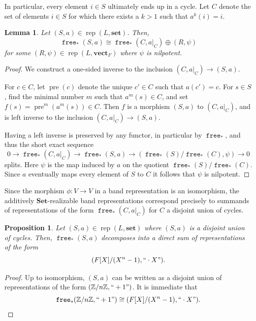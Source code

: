 \documentclass[a4paper]{amsart}
\theoremstyle{plain}
\newtheorem{lemma}[theorem]{Lemma}
\newtheorem{proposition}[theorem]{Proposition}
\theoremstyle{definition}
\theoremstyle{remark}
\newcommand{\funct}[1]{\operatorname{\mathtt{#1}}}
\newcommand{\iso}{\cong}
\newcommand{\Set}{\mathbf{Set}}
\newcommand{\set}{\mathbf{set}}
\newcommand{\vectF}{\mathbf{vect}_F}
\newcommand{\Z}{\mathbb{Z}}
\DeclareMathOperator{\rep}{rep}
\begin{document}
In particular, every element $i\in S$ ultimately ends up in a cycle. Let $C$ denote the set of elements $i\in S$ for which there exists a $k>1$ such that $a^k(i) = i$.
\begin{lemma}\label{lem.Ainf-inj}
Let $(S,a)\in \rep(L, \set)$. Then, 
\[\funct{free}_*(S,a) \cong \funct{free}_*(C, a|_C) \oplus (R, \psi)\]
for some $(R, \psi)\in \rep(L, \vectF)$ where $\psi$ is nilpotent. 
\end{lemma}

\begin{proof}
We construct a one-sided inverse to the inclusion \( (C, a|_C) \to (S, a) \).

For $c\in C$, let $\operatorname{pre}(c)$ denote the unique $c'\in C$ such that $a(c') = c$. For \( s \in S \), find the minimal number \( m \) such that \( a^m(s) \in C \), and set \( f(s) = \operatorname{pre}^m(a^m(s)) \in C \). Then \( f \) is a morphism \( (S, a) \) to \( (C, a|_C) \), and is left inverse to the inclusion \( (C, a|_C) \to (S, a) \).

Having a left inverse is preserved by any functor, in particular by \( \funct{free}_* \), and thus the short exact sequence
\[ 0 \to \funct{free}_*(C, a|_C) \to \funct{free}_*(S, a) \to (\funct{free}_*(S)/\funct{free}_*(C), \psi) \to 0 \]
splits. Here \( \psi \) is the map induced by \( a \) on the quotient \( \funct{free}_*(S)/\funct{free}_*(C) \). Since \( a \) eventually maps every element of \( S \) to \( C \) it follows that \( \psi \) is nilpotent.
\end{proof}

Since the morphism $\phi\colon V\to V$ in a band representation is an isomorphism, the additively $\Set$-realizable band representations correspond precisely to summands of representations of the form $\funct{free}_*(C,a|_C)$ for $C$ a disjoint union of cycles.

\begin{proposition}\label{prop.Ainf-set}
Let $(S,a)\in \rep(L, \set)$ where $(S,a)$ is a disjoint union of cycles. Then, $\funct{free}_*(S,a)$ decomposes into a direct sum of representations of the form
\[  (F[X] / (X^n-1), ``\cdot X"). \] 
\end{proposition}
\begin{proof}Up to isomorphism, $(S,a)$ can be written as a disjoint union of representations of the form \( ( \Z /n\Z , ``+1") \). It is immediate that
\[\funct{free}_*(\mathbb Z /n\Z, ``+1") \iso (F[X] / (X^n-1), ``\cdot X"). \qedhere \]
\end{proof}
\end{document}
